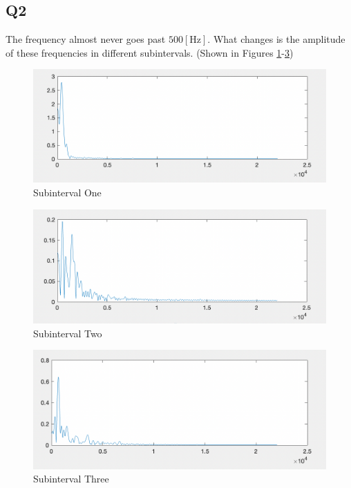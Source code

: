 \documentclass[
	letterpaper, %
	10pt, %
]{CSUniSchoolLabReport}
\begin{document}
\subsection{Q2} The frequency almost never goes past $500[\si{\hertz}]$. What changes is the amplitude of these frequencies in different subintervals. (Shown in Figures \ref{fig:2}-\ref{fig:4})

\begin{figure}[H]
  \centering
  \includegraphics[width=.9\textwidth]{Figures/L12Q2-1.png}
  \caption{Subinterval One}
  \label{fig:2}
\end{figure}

\begin{figure}[H]
  \centering
  \includegraphics[width=.9\textwidth]{Figures/L12Q2-2.png}
  \caption{Subinterval Two}
  \label{fig:3}
\end{figure}

\begin{figure}[H]
  \centering
  \includegraphics[width=.9\textwidth]{Figures/L12Q2-3.png}
  \caption{Subinterval Three}
  \label{fig:4}
\end{figure}
\end{document}
